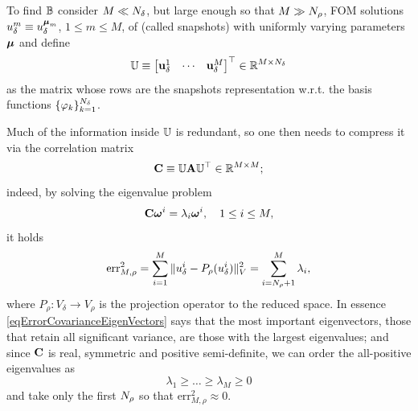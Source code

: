 \documentclass[
    conference,
    nofonttune,
    11pt
]{IEEEtran}
\begin{document}
            To find ${\mathbb B}$ consider $M\ll{N_\delta}$, but large enough so that $M\gg{N_\rho}$, FOM solutions $ u^m_\delta\equiv u^{{\boldsymbol\mu}_m}_\delta$, $1\le m\le M$, of  (called snapshots) with uniformly varying parameters ${\boldsymbol\mu}$ and define
            $$
                {\mathbb U}\equiv
                \begin{bmatrix}
                    {\mathbf u}^1_\delta&
                    \cdots&
                    {\mathbf u}^M_\delta
                \end{bmatrix}^\top
                \in{\mathbb R}^{M\times{N_\delta}}
            $$
            as the matrix whose rows are the snapshots representation w.r.t. the basis functions $\{\varphi_k\}_{k=1}^{N_\delta}$.
            
            Much of the information inside ${\mathbb U}$ is redundant, so one then needs to compress it via the correlation matrix
            \begin{equation}
                \label{eqCovarianceMatrixDefinition}
                \mBF C\equiv\mBB U\mBF A\mBB U^\top\in\mBB R^{M\times M};
            \end{equation}
            indeed, by solving the eigenvalue problem
            \begin{equation}
                \label{eqCovarianceMatrixEigenProblem}
                \mBF C\boldomega^i=\lambda_i\boldomega^i,\quad1\le i\le M,
            \end{equation}
            it holds
            \begin{equation}
                \label{eqErrorCovarianceEigenVectors}
                \text{err}^2_{M,\rho}
                =\sum_{i=1}^M
                \Vert u_\delta^i-P_\rho(u_\delta^i)\Vert_V^2=
                \sum_{i=\Nrho+1}^M\lambda_i,
            \end{equation}
            where $P_\rho:V_\delta\to V_\rho$ is the projection operator to the reduced space. In essence \eqref{eqErrorCovarianceEigenVectors} says that the most important eigenvectors, \ie{} those that retain all significant variance, are those with the largest eigenvalues; and since ${\mathbf C}$ is real, symmetric and positive semi-definite, we can order the all-positive eigenvalues as $$\lambda_1\ge\dots\ge\lambda_M\ge0$$ and take only the first ${N_\rho}$ so that $\text{err}^2_{M,\rho}\approx0$.
\end{document}
